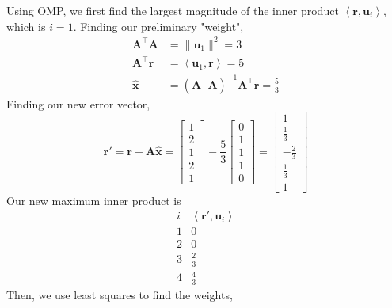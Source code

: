 \documentclass[]{article}
\newcommand{\unit}[1]{\bm{\hat{#1}}}
\newcommand{\iprod}[2]{\left\langle #1, #2 \right\rangle}
\newcommand{\tpose}[1]{#1^{\! \top} \!}
\begin{document}
Using OMP, we first find the largest magnitude of the inner product \(\iprod{\bm{r}}{\bm{u}_i}\), which is \(i = 1\).
Finding our preliminary "weight",
\begin{align}
	\tpose{\bm{A}} \bm{A} &= \|\bm{u}_1\|^2 = 3 \\
	\tpose{\bm{A}} \bm{r} &= \iprod{\bm{u}_1}{\bm{r}} = 5 \\
	\unit{x} &= (\tpose{\bm{A}} \bm{A})^{-1} \tpose{\bm{A}} \bm{r} = \frac{5}{3}
\end{align}
Finding our new error vector,
\begin{equation}
	\bm{r}' = \bm{r} - \bm{A}\unit{x} =
	\begin{bmatrix}
	1 \\
	2 \\
	1 \\
	2 \\
	1
	\end{bmatrix}
	-
	\frac{5}{3}\begin{bmatrix}
	0 \\
	1 \\
	1 \\
	1 \\
	0
	\end{bmatrix}
	=
	\begin{bmatrix}
	1 \\
	\frac{1}{3} \\
	-\frac{2}{3} \\
	\frac{1}{3} \\
	1
	\end{bmatrix}
\end{equation}
Our new maximum inner product is
\[\begin{array}{c|c}
	i & \iprod{\bm{r}'}{\bm{u}_i} \\
	\hline
	1 & 0 \\
	2 & 0 \\
	3 & \frac{2}{3} \\
	4 & \frac{4}{3}
\end{array}\]
Then, we use least squares to find the weights,
\end{document}
